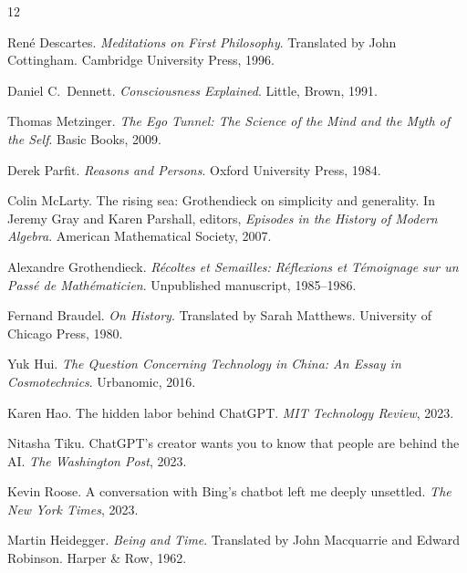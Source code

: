 \documentclass[12pt,a4paper]{article}
\begin{document}

\begin{thebibliography}{12}

Ren\'e Descartes.
\newblock \emph{Meditations on First Philosophy}.
\newblock Translated by John Cottingham. Cambridge University Press, 1996.

Daniel C.~Dennett.
\newblock \emph{Consciousness Explained}.
\newblock Little, Brown, 1991.

Thomas Metzinger.
\newblock \emph{The Ego Tunnel: The Science of the Mind and the Myth of the Self}.
\newblock Basic Books, 2009.

Derek Parfit.
\newblock \emph{Reasons and Persons}.
\newblock Oxford University Press, 1984.

Colin McLarty.
\newblock The rising sea: Grothendieck on simplicity and generality.
\newblock In Jeremy Gray and Karen Parshall, editors, \emph{Episodes in the History of Modern Algebra}. American Mathematical Society, 2007.

Alexandre Grothendieck.
\newblock \emph{R\'ecoltes et Semailles: R\'eflexions et T\'emoignage sur un Pass\'e de Math\'ematicien}.
\newblock Unpublished manuscript, 1985--1986.

Fernand Braudel.
\newblock \emph{On History}.
\newblock Translated by Sarah Matthews. University of Chicago Press, 1980.

Yuk Hui.
\newblock \emph{The Question Concerning Technology in China: An Essay in Cosmotechnics}.
\newblock Urbanomic, 2016.

Karen Hao.
\newblock The hidden labor behind ChatGPT.
\newblock \emph{MIT Technology Review}, 2023.

Nitasha Tiku.
\newblock ChatGPT's creator wants you to know that people are behind the AI.
\newblock \emph{The Washington Post}, 2023.

Kevin Roose.
\newblock A conversation with Bing's chatbot left me deeply unsettled.
\newblock \emph{The New York Times}, 2023.

Martin Heidegger.
\newblock \emph{Being and Time}.
\newblock Translated by John Macquarrie and Edward Robinson. Harper \& Row, 1962.

\end{thebibliography}
\end{document}
